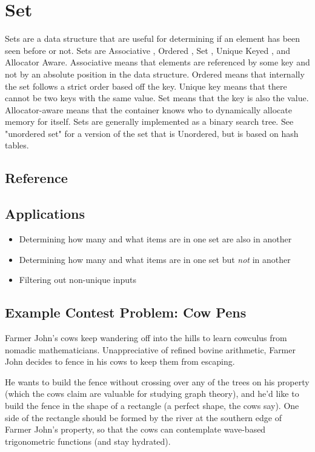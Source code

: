 \section{Set}
Sets are a data structure that are useful for determining if an element has been seen before or not.
Sets are Associative , Ordered , Set , Unique Keyed , and Allocator Aware\cite{cplusplus}.
Associative means that elements are referenced by some key and not by an absolute position in the data structure.
Ordered means that internally the set follows a strict order based off the key.
Unique key means that there cannot be two keys with the same value.
Set means that the key is also the value.
Allocator-aware means that the container knows who to dynamically allocate memory for itself.
Sets are generally implemented as a binary search tree.
See "unordered set" for a version of the set that is Unordered, but is based on hash tables.

\subsection{Reference}


\subsection{Applications}

\begin{itemize}
    \item   Determining how many and what items are in one set are also in another
    \item   Determining how many and what items are in one set but \emph{not} in another
    \item   Filtering out non-unique inputs
\end{itemize}

\subsection{Example Contest Problem: Cow Pens}
Farmer John's cows keep wandering off into the hills to learn cowculus from nomadic mathematicians.
Unappreciative of refined bovine arithmetic, Farmer John decides to fence in his cows to keep them from escaping.

He wants to build the fence without crossing over any of the trees on his property (which the cows claim are valuable for studying graph theory), and he'd like to build the fence in the shape of a rectangle (a perfect shape, the cows say).
One side of the rectangle should be formed by the river at the southern edge of Farmer John's property, so that the cows can contemplate wave-based trigonometric functions (and stay hydrated).

